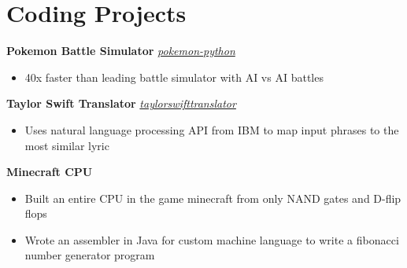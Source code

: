 \documentclass[10pt,letterpaper]{article}
\begin{document}
\section*{Coding Projects} \hrulefill 

\textbf{Pokemon Battle Simulator} \hfill {} \href{https://github.com/nicolaslindbloomairey/pokemon-python}{\textit{pokemon-python}}
\begin{itemize}
    \item 40x faster than leading battle simulator with AI vs AI battles
\end{itemize}

\textbf{Taylor Swift Translator} \hfill {} \href{https://github.com/nicolaslindbloomairey/taylorswifttranslator}{\textit{taylorswifttranslator}}
\begin{itemize}
    \item Uses natural language processing API from IBM to map input phrases to the most similar lyric
\end{itemize}

\textbf{Minecraft CPU} \hfill 
\begin{itemize}
    \item Built an entire CPU in the game minecraft from only NAND gates and D-flip flops
    \item Wrote an assembler in Java for custom machine language to write a fibonacci number generator program
\end{itemize}
%
%
\end{document}
